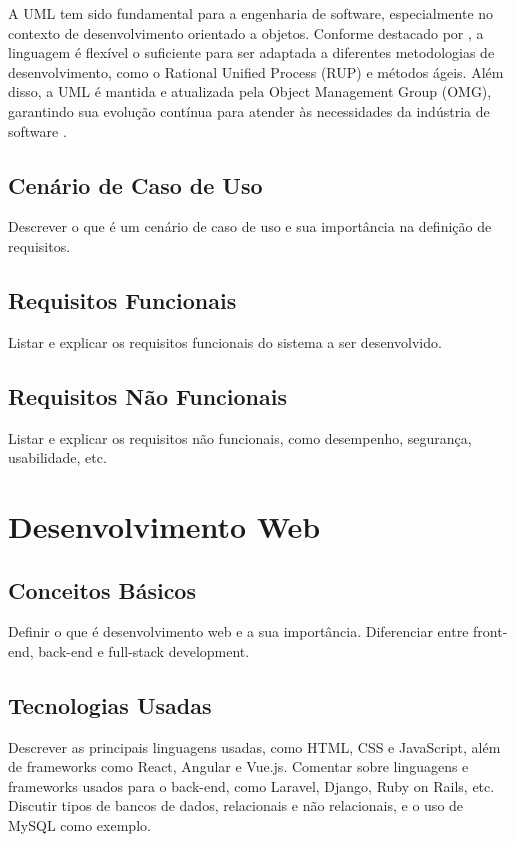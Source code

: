 A UML tem sido fundamental para a engenharia de software, especialmente no contexto de desenvolvimento orientado a objetos. Conforme destacado por \cite{Fowler2005}, a linguagem é flexível o suficiente para ser adaptada a diferentes metodologias de desenvolvimento, como o Rational Unified Process (RUP) e métodos ágeis. Além disso, a UML é mantida e atualizada pela Object Management Group (OMG), garantindo sua evolução contínua para atender às necessidades da indústria de software \citep{OMG2017}.

\subsection{Cenário de Caso de Uso}
Descrever o que é um cenário de caso de uso e sua importância na definição de requisitos.

\subsection{Requisitos Funcionais}
Listar e explicar os requisitos funcionais do sistema a ser desenvolvido.

\subsection{Requisitos Não Funcionais}
Listar e explicar os requisitos não funcionais, como desempenho, segurança, usabilidade, etc.

\section{Desenvolvimento Web}
\subsection{Conceitos Básicos}
Definir o que é desenvolvimento web e a sua importância. Diferenciar entre front-end, back-end e full-stack development.

\subsection{Tecnologias Usadas}
Descrever as principais linguagens usadas, como HTML, CSS e JavaScript, além de frameworks como React, Angular e Vue.js. Comentar sobre linguagens e frameworks usados para o back-end, como Laravel, Django, Ruby on Rails, etc. Discutir tipos de bancos de dados, relacionais e não relacionais, e o uso de MySQL como exemplo.

